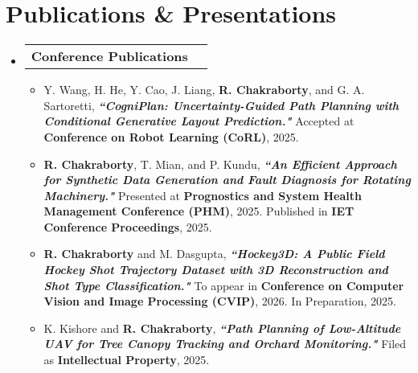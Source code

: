 \documentclass[letterpaper,11pt]{article}
\makeatletter
\newcommand{\resumeItem}[1]{
  \item \small{#1\vspace{-2pt}}
}
\newcommand{\resumeProjectHeading}[2]{
  \vspace{0pt}\item
  \begin{tabular*}{0.97\textwidth}[t]{l@{\extracolsep{\fill}}r}
    \small #1 & #2 \\
  \end{tabular*}\vspace{-6pt}
}
\newcommand{\resumeSubHeadingListStart}{
  \begin{itemize}[leftmargin=0.10in, label={}]\vspace{6pt}
}
\newcommand{\resumeSubHeadingListEnd}{
  \end{itemize}
}
\newcommand{\resumeItemListStart}{
  \begin{itemize}[leftmargin=0.18in]
}
\newcommand{\resumeItemListEnd}{
  \end{itemize}\vspace{-6pt}
}
\makeatother
\begin{document}
\section{Publications \& Presentations}
\resumeSubHeadingListStart
  \resumeProjectHeading
    {\textbf{Conference Publications}}{}
  \resumeItemListStart
    \resumeItem{Y. Wang, H. He, Y. Cao, J. Liang, \textbf{R. Chakraborty}, and G. A. Sartoretti,  
    \textbf{\textit{``CogniPlan: Uncertainty-Guided Path Planning with Conditional Generative Layout Prediction."}}  
    Accepted at \textbf{Conference on Robot Learning (CoRL)}, 2025.  
    \color{blue}\href{https://arxiv.org/pdf/2508.03027}{\textbf{\faExternalLink*}}}
    \vspace{4pt}
    \resumeItem{\textbf{R. Chakraborty}, T. Mian, and P. Kundu,  
    \textbf{\textit{``An Efficient Approach for Synthetic Data Generation and Fault Diagnosis for Rotating Machinery."}}  
    Presented at \textbf{Prognostics and System Health Management Conference (PHM)}, 2025.  
    Published in \textbf{IET Conference Proceedings}, 2025.  
    \color{blue}\href{https://digital-library.theiet.org/doi/abs/10.1049/icp.2025.2364}{\textbf{\faExternalLink*}}}
    \vspace{4pt}
    \resumeItem{\textbf{R. Chakraborty} and M. Dasgupta,  
    \textbf{\textit{``Hockey3D: A Public Field Hockey Shot Trajectory Dataset with 3D Reconstruction and Shot Type Classification."}}  
    To appear in \textbf{Conference on Computer Vision and Image Processing (CVIP)}, 2026.  
    In Preparation, 2025. \color{blue}\href{https://drive.google.com/file/d/1XSeU50fM_yJUn0u2wcNOM2itZovqAA2V/view?usp=drive_link}{\textbf{\faExternalLink*}}}
    \vspace{4pt}
    \resumeItem{K. Kishore and \textbf{R. Chakraborty},  
    \textbf{\textit{``Path Planning of Low-Altitude UAV for Tree Canopy Tracking and Orchard Monitoring."}}  
    Filed as \textbf{Intellectual Property}, 2025.  
    \color{blue}\href{https://drive.google.com/file/d/1TZ-1WKuYXeAOZaP7R5TnSufCdyz3sn4a/view?usp=sharing}{\textbf{\faExternalLink*}}}
    \vspace{4pt}
  \resumeItemListEnd
\resumeSubHeadingListEnd
\end{document}
